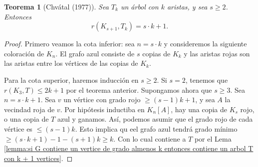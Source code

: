 \documentclass[12pt]{report}
\theoremstyle{plain}
\newtheorem{theorem}{Teorema}[section]
\theoremstyle{definition}
\begin{document}
\begin{theorem}[Chvátal (1977)]
Sea $T_k$ un árbol con $k$ aristas, y sea $s \geq 2$. Entonces
\[
    r(K_{s+1}, T_k) = s \cdot k  + 1.
\]
\end{theorem}
\begin{proof}
Primero veamos la cota inferior: sea $n = s\cdot k$ y consideremos la siguiente coloración de $K_n$. El grafo azul consiste de $s$ copias de $K_k$ y las aristas rojas son las aristas entre los vértices de las copias de $K_k$.


Para la cota superior, haremos inducción en $s \geq 2$. Si $s = 2$, tenemos que $r (K_3, T) \leq 2 k + 1$ por el teorema anterior. Supongamos ahora que $s \geq 3$. Sea $n = s\cdot k + 1$. Sea $v$ un vértice con grado rojo $\geq (s-1)k + 1$, y sea $A$ la vecindad roja de $v$. Por hipótesis inductiba en $K_n[A]$, hay una copia de $K_s$ rojo, o una copia de $T$ azul y ganamos. Así, podemos asumir que el grado rojo de cada vértice es $\leq (s-1)k$. Esto implica qu eel grafo azul tendrá grado mínimo $\geq (s \cdot k +1 ) - 1 - (s + 1) k \geq k$. Con lo cual contiene a $T$ por el Lema \ref{lemma:si G contiene un vertice de grado almenos k entonces contiene un arbol T con k + 1 vertices}.
\end{proof}


































%





\newpage


{}

\end{document}
